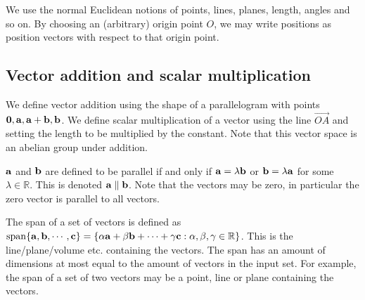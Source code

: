 We use the normal Euclidean notions of points, lines, planes, length, angles and so on.
By choosing an (arbitrary) origin point \(O\), we may write positions as position vectors with respect to that origin point.

\subsection{Vector addition and scalar multiplication}
We define vector addition using the shape of a parallelogram with points \(\vb 0, \vb a, \vb a + \vb b, \vb b\).
We define scalar multiplication of a vector using the line \(\overrightarrow{OA}\) and setting the length to be multiplied by the constant.
Note that this vector space is an abelian group under addition.
\begin{definition}
	\(\vb a\) and \(\vb b\) are defined to be parallel if and only if \(\vb a = \lambda \vb b\) or \(\vb b = \lambda \vb a\) for some \(\lambda \in \mathbb R\).
	This is denoted \(\vb a \parallel \vb b\).
	Note that the vectors may be zero, in particular the zero vector is parallel to all vectors.
\end{definition}
\begin{definition}
	The span of a set of vectors is defined as \(\operatorname{span} \{\vb a, \vb b, \cdots, \vb c\} = \{ \alpha \vb a + \beta \vb b + \cdots + \gamma \vb c: \alpha, \beta, \gamma \in \mathbb R \}\).
	This is the line/plane/volume etc.
	containing the vectors.
	The span has an amount of dimensions at most equal to the amount of vectors in the input set.
	For example, the span of a set of two vectors may be a point, line or plane containing the vectors.
\end{definition}

